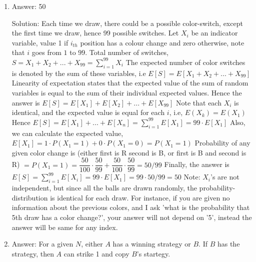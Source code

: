 \begin{enumerate}
\item
Answer: 50
 
Solution: Each time we draw, there could be a possible color-switch, except the first time we draw, hence 99 possible switches.
Let $X_i$ be an indicator variable, value 1 if $i_{th}$ position has a colour change and zero otherwise, note that $i$ goes from $1$ to $99$.
Total number of switches, $S = X_1 + X_2 + ... + X_{99} = \sum_{i=1}^{99} X_i$
The expected number of color switches is denoted by the sum of these variables, i.e $E[S] = E[X_1 + X_2 + ... + X_{99}]$
Linearity of expectation states that the expected value of the sum of random variables is equal to the sum of their individual expected values.
Hence the answer is $E[S] = E[X_1] + E[X_2] + ... + E[X_{99}]$
Note that each $X_i$ is identical, and the expected value is equal for each $i$, i.e, $E(X_k) = E(X_1) $
Hence $E[S] = E[X_1] + ... + E[X_n] = \sum_{i=1}^{99} E[X_1] = 99 \cdot E[X_1] $
Also, we can calculate the expected value, $E[X_1] = 1 \cdot P(X_1 = 1) + 0 \cdot P(X_1 = 0) = P(X_1 =1) $
Probability of any given color change is (either first is R second is B, or first is B and second is R) $= P(X_1 = 1)= \dfrac{50}{100} \cdot \dfrac{50}{99} + \dfrac{50}{100} \cdot \dfrac{50}{99} = 50/99$
Finally, the answer is $ E[S] = \sum_{i=1}^{99} E[X_i] = 99 \cdot E[X_1] = 99 \cdot 50/99 = 50$
Note:
$X_i$'s are not independent, but since all the balls are drawn randomly, the probability-distribution is identical for each draw. For instance, if you are given no information about the previous colors, and I ask 'what is the probability that 5th draw has a color change?', your answer will not depend on '5', instead the answer will be same for any index.




\item
Answer: For a given $N$, either $A$ has a winning strategy or $B$. If $B$ has the strategy, then $A$ can strike 1 and copy $B$'s startegy.
 

\end{enumerate}
